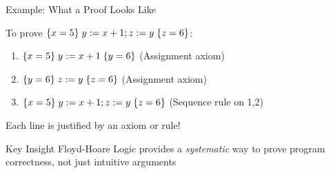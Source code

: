 \begin{frame}{Example: What a Proof Looks Like}
    \begin{example}
        To prove $\{x = 5\}\; y := x + 1; z := y\; \{z = 6\}$:
        
        \begin{enumerate}
            \item $\{x = 5\}\; y := x + 1\; \{y = 6\}$ \hfill (Assignment axiom)
            \item $\{y = 6\}\; z := y\; \{z = 6\}$ \hfill (Assignment axiom)
            \item $\{x = 5\}\; y := x + 1; z := y\; \{z = 6\}$ \hfill (Sequence rule on 1,2)
        \end{enumerate}
        
        Each line is justified by an axiom or rule!
    \end{example}
    
    \begin{block}{Key Insight}
        Floyd-Hoare Logic provides a \emph{systematic} way to prove program correctness, not just intuitive arguments
    \end{block}
\end{frame}